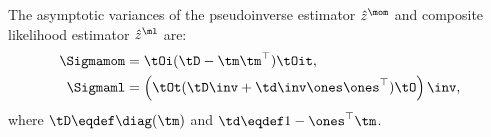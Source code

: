 %
%
\begin{lemma*}
  The asymptotic variances of the pseudoinverse estimator $\hat z^\mom$
  and composite likelihood estimator $\hat z^\ml$ are:
  \begin{align*}
    \Sigmamom 
      &= \tOi (\tD - \tm \tm^\top) \tOit, \\
    \Sigmaml 
      &=
      \left( \tOt (\tD\inv + \td\inv \ones\ones^\top) \tO \right)\inv,
  \end{align*}
  where $\tD \eqdef \diag(\tm)$ and $\td \eqdef 1 - \ones^\top\tm$.
\end{lemma*}

